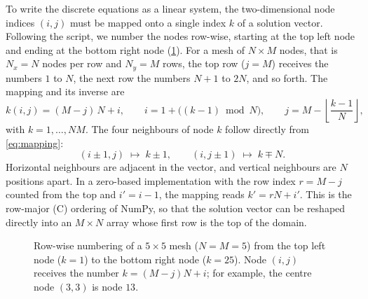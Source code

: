 \documentclass[11pt,a4paper]{article}
\numberwithin{equation}{section}
\theoremstyle{definition}
\theoremstyle{remark}
\begin{document}
To write the discrete equations as a linear system, the two-dimensional node indices
$(i,j)$ must be mapped onto a single index $k$ of a solution vector. Following the
script, we number the nodes row-wise, starting at the top left node and ending at the
bottom right node (\cref{fig:numbering}). For a mesh of $N \times M$ nodes, that is
$N_x = N$ nodes per row and $N_y = M$ rows, the top row ($j = M$) receives the numbers
$1$ to $N$, the next row the numbers $N + 1$ to $2N$, and so forth. The mapping and its
inverse are
\begin{equation}\label{eq:mapping}
  k(i,j) = (M - j)\,N + i,
  \qquad
  i = 1 + \bigl((k - 1) \bmod N\bigr),
  \qquad
  j = M - \left\lfloor \frac{k - 1}{N} \right\rfloor,
\end{equation}
with $k = 1, \dots, NM$. The four neighbours of node $k$ follow directly from
\eqref{eq:mapping}:
\begin{equation}\label{eq:neighbours}
  (i \pm 1, j) \;\mapsto\; k \pm 1,
  \qquad
  (i, j \pm 1) \;\mapsto\; k \mp N.
\end{equation}
Horizontal neighbours are adjacent in the vector, and vertical neighbours are $N$
positions apart. In a zero-based implementation with the row index $r = M - j$ counted
from the top and $i' = i - 1$, the mapping reads $k' = rN + i'$. This is the row-major
(C) ordering of NumPy, so that the solution vector can be reshaped directly into an
$M \times N$ array whose first row is the top of the domain.

\begin{figure}[ht]
  \centering
  \caption{Row-wise numbering of a $5 \times 5$ mesh ($N = M = 5$) from the top left node
    ($k = 1$) to the bottom right node ($k = 25$). Node $(i,j)$ receives the number
    $k = (M - j)N + i$; for example, the centre node $(3,3)$ is node $13$.}
  \label{fig:numbering}
\end{figure}
\end{document}
